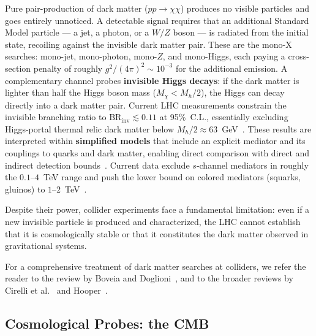 Pure pair-production of dark matter ($pp \to \chi\chi$) produces no visible particles and goes entirely unnoticed.
A detectable signal requires that an additional Standard Model particle --- a jet, a photon, or a $W/Z$ boson --- is radiated from the initial state, recoiling against the invisible dark matter pair.
These are the mono-X searches: mono-jet, mono-photon, mono-$Z$, and mono-Higgs, each paying a cross-section penalty of roughly $g^2/(4\pi)^2 \sim 10^{-3}$ for the additional emission.
A complementary channel probes \textbf{invisible Higgs decays}: if the dark matter is lighter than half the Higgs boson mass ($M_\chi < M_h/2$), the Higgs can decay directly into a dark matter pair.
Current LHC measurements constrain the invisible branching ratio to $\text{BR}_\text{inv} \lesssim 0.11$ at 95\%~C.L., essentially excluding Higgs-portal thermal relic dark matter below $M_h/2 \approx 63$~GeV~\cite{ATLAS:2023tkt}.
These results are interpreted within \textbf{simplified models} that include an explicit mediator and its couplings to quarks and dark matter, enabling direct comparison with direct and indirect detection bounds~\cite{Boveia:2018yeb}.
Current data exclude $s$-channel mediators in roughly the $0.1$--$4$~TeV range and push the lower bound on colored mediators (squarks, gluinos) to $1$--$2$~TeV~\cite{Hooper:2024}.

Despite their power, collider experiments face a fundamental limitation: even if a new invisible particle is produced and characterized, the LHC cannot establish that it is cosmologically stable or that it constitutes the dark matter observed in gravitational systems.

For a comprehensive treatment of dark matter searches at colliders, we refer the reader to the review by Boveia and Doglioni~\cite{Boveia:2018yeb}, and to the broader reviews by Cirelli et al.~\cite{Cirelli:2024ssz} and Hooper~\cite{Hooper:2024}.

\subsection{\texorpdfstring{Cosmological Probes: the CMB}{Cosmological Probes: the CMB}}
\label{sec:1.3.3}


